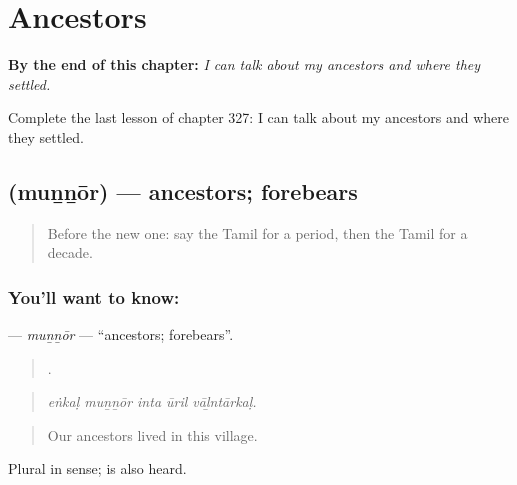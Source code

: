 
\chapter{Ancestors}
\label{ch:ta-ancestors}

\begin{chapteropening}
\textbf{By the end of this chapter:} \emph{I can talk about my ancestors and where they settled.}

Complete the last lesson of chapter 327: I can talk about my ancestors and where they settled.
\end{chapteropening}

\section[\texorpdfstring{\ta{முன்னோர்} (muṉṉōr)}{முன்னோர் (muṉṉōr)}]{ (muṉṉōr) — ancestors; forebears}

\label{lesson:TA-C327-munnor}



\begin{quote}
Before the new one: say the Tamil for a period, then the Tamil for a decade.
\end{quote}

\subsection*{You'll want to know: }
\textbf{} — \emph{muṉṉōr} — \textquotedblleft{}ancestors; forebears\textquotedblright{}.

\begin{quote}
    .
\end{quote}

\begin{quote}
\emph{eṅkaḷ muṉṉōr inta ūril vāḻntārkaḷ.}
\end{quote}

\begin{quote}
Our ancestors lived in this village.
\end{quote}

Plural in sense;  is also heard.

